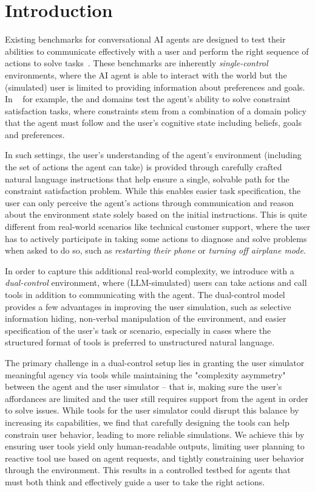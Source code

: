 \section{Introduction}

Existing benchmarks for conversational AI agents are designed to test their abilities to communicate effectively with a user and perform the right sequence of actions to solve tasks~\cite{yao2024tau,lu2024toolsandbox, xiao2024flowbench, prabhakar2025apigen}. These benchmarks are inherently \emph{single-control} environments, where the AI agent is able to interact with the world but the (simulated) user is limited to providing information about preferences and goals. In \taubench~\cite{yao2024tau} for example, the \retail and \airline domains test the agent's ability to solve constraint satisfaction tasks, where constraints stem from a combination of a domain policy that the agent must follow and the user's cognitive state including beliefs, goals and preferences.



In such settings, the user's understanding of the agent's environment (including the set of actions the agent can take) is provided through carefully crafted natural language instructions that help ensure a single, solvable path for the constraint satisfaction problem. While this enables easier task specification, the user can only perceive the agent's actions through communication and reason about the environment state solely based on the initial instructions. This is quite different from real-world scenarios like technical customer support, where the user has to actively participate in taking some actions to diagnose and solve problems when asked to do so, such as \textit{restarting their phone} or \textit{turning off airplane mode}.

In order to capture this additional real-world complexity, we introduce \bench with a \textit{dual-control} environment, where (LLM-simulated) users can take actions and call tools in addition to communicating with the agent. The dual-control model provides a few advantages in improving the user simulation, such as selective information hiding, non-verbal manipulation of the environment, and easier specification of the user's task or scenario, especially in cases where the structured format of tools is preferred to unstructured natural language. 

The primary challenge in a dual-control setup lies in granting the user simulator meaningful agency via tools while maintaining the "complexity asymmetry" between the agent and the user simulator -- that is, making sure the user's affordances are limited and the user still requires support from the agent in order to solve issues. While tools for the user simulator could disrupt this balance by increasing its capabilities, we find that carefully designing the tools can help constrain user behavior, leading to more reliable simulations. We achieve this by ensuring user tools yield only human-readable outputs, limiting user planning to reactive tool use based on agent requests, and tightly constraining user behavior through the environment. This results in a controlled testbed for agents that must both think and effectively guide a user to take the right actions. 

